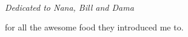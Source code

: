 \documentclass{tufte-book}
\begin{document}
\cleardoublepage
\tableofcontents


\cleardoublepage
~\vfill
\begin{doublespace}
\noindent\fontsize{16}{18}\selectfont\itshape
\nohyphenation
Dedicated to Nana, Bill and Dama 

for all the awesome food they introduced me to.
\end{doublespace}
\vfill
\vfill




\mainmatter

\begin{figure}[p]
\hfill
{}
\\\vspace{\baselineskip}

\end{figure}
\end{document}
